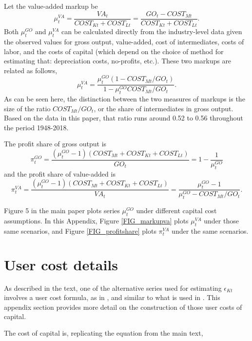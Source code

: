 \documentclass[11pt]{article}
\begin{document}
Let the value-added markup be
\begin{equation}
	\mu^{VA}_t = \frac{VA_t}{COST_{Kt}+COST_{Lt}} = \frac{GO_t-COST_{Mt}}{COST_{Kt} + COST_{Lt}}.
\end{equation}
Both $\mu_t^{GO}$ and $\mu_t^{VA}$ can be calculated directly from the industry-level data given the observed values for gross output, value-added, cost of intermediates, costs of labor, and the costs of capital (which depend on the choice of method for estimating that: depreciation costs, no-profits, etc.). These two markups are related as follows, 
\begin{equation}
	\mu^{VA}_t = \frac{\mu^{GO}_t(1-COST_{Mt}/GO_t)}{1-\mu^{GO}_tCOST_{Mt}/GO_t}.
\end{equation}
As can be seen here, the distinction between the two measures of markups is the size of the ratio $COST_{Mt}/GO_t$, or the share of intermediates in gross output. Based on the data in this paper, that ratio runs around 0.52 to 0.56 throughout the period 1948-2018.

The profit share of gross output is
\begin{equation}
	\pi^{GO}_t = \frac{(\mu^{GO}_t - 1)(COST_{Mt} + COST_{Kt} + COST_{Lt})}{GO_t} = 1 - \frac{1}{\mu^{GO}_t}
\end{equation}
and the profit share of value-added is
\begin{equation}
	\pi^{VA}_t = \frac{(\mu^{GO}_t - 1)(COST_{Mt} + COST_{Kt} + COST_{Lt})}{VA_t} = \frac{\mu^{GO}_t-1}{\mu^{GO}_t - COST_{Mt}/GO_t}.
\end{equation}

Figure 5 in the main paper plots series $\mu_t^{GO}$ under different capital cost assumptions. In this Appendix, Figure \ref{FIG_markupva} plots $\mu_t^{VA}$ under those same scenarios, and Figure \ref{FIG_profitshare} plots $\pi^{VA}_t$ under the same scenarios. 

\section{User cost details}\label{SEC_usercost}
As described in the text, one of the alternative series used for estimating $\epsilon_{Kt}$ involves a user cost formula, as in \cite{halljorg1967}, and similar to what is used in \cite{Barkai000,rognlie2015}. This appendix section provides more detail on the construction of those user costs of capital. 

The cost of capital is, replicating the equation from the main text,
\end{document}
